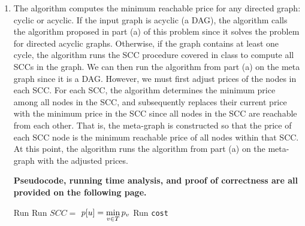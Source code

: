 \documentclass[twoside,11pt]{homework}
\newcommand\NoProc{\renewcommand\algorithmicprocedure{}}
\begin{document}
\begin{enumerate}[\bf (a)]
\item  The algorithm computes the minimum reachable price for any directed graph: cyclic or acyclic.  If the input graph is acyclic (a DAG), the algorithm calls the algorithm proposed in part (a) of this problem since it solves the problem for directed acyclic graphs.  Otherwise, if the graph contains at least one cycle, the algorithm runs the SCC procedure covered in class to compute all SCCs in the graph.  We can then run the algorithm from part (a) on the meta graph since it is a DAG.  However, we must first adjust prices of the nodes in each SCC.  For each SCC,  the algorithm determines the minimum price among all nodes in the SCC, and subsequently replaces their current price with the minimum price in the SCC since all nodes in the SCC are reachable from each other.  That is,  the meta-graph is constructed so that the price of each SCC node is the minimum reachable price of all nodes within that SCC.  At this point,  the algorithm runs the algorithm from part (a) on the meta-graph with the adjusted prices. 

\noindent
\textbf{Pseudocode,  running time analysis, and proof of correctness are all provided on the following page.}
\begin{algorithm}[H]
\begin{algorithmic}[1]
\NoProc
{}
\State Run 
   
\State Run   
  
\State $SCC = $    
   
         
\State $p[u] = \mathlarger{ \min_{v \in T} p_v}$   
\EndFor
\EndFor
\State Run   
\EndIf
\State \Return \texttt{cost}
\EndProcedure
\end{algorithmic}
\end{algorithm}


\end{enumerate}
\end{document}
